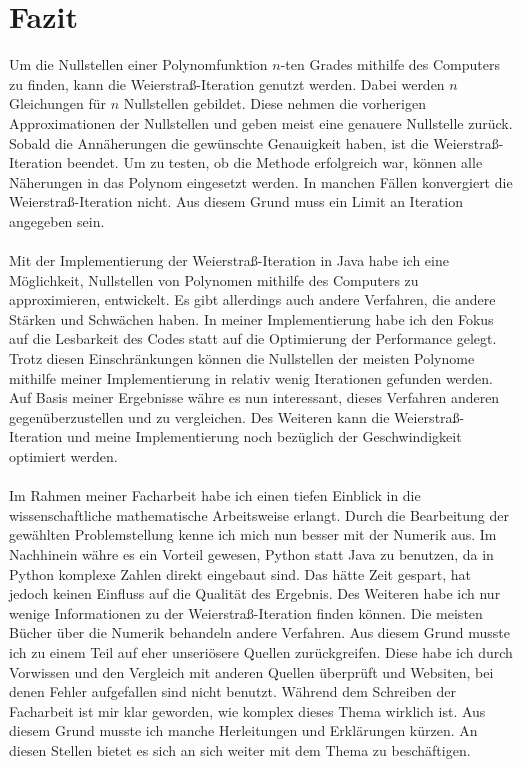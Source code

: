 \documentclass[12pt]{article}
\begin{document}
\section{Fazit}
Um die Nullstellen einer Polynomfunktion $n$-ten Grades mithilfe des Computers zu finden, kann die Weierstraß-Iteration genutzt werden. Dabei werden $n$ Gleichungen für $n$ Nullstellen gebildet. Diese nehmen die vorherigen Approximationen der Nullstellen und geben meist eine genauere Nullstelle zurück. Sobald die Annäherungen die gewünschte Genauigkeit haben, ist die Weierstraß-Iteration beendet. Um zu testen, ob die Methode erfolgreich war, können alle Näherungen in das Polynom eingesetzt werden. In manchen Fällen konvergiert die Weierstraß-Iteration nicht. Aus diesem Grund muss ein Limit an Iteration angegeben sein.\\
\\
Mit der Implementierung der Weierstraß-Iteration in Java habe ich eine Möglichkeit, Nullstellen von Polynomen mithilfe des Computers zu approximieren, entwickelt. Es gibt allerdings auch andere Verfahren, die andere Stärken und Schwächen haben. In meiner Implementierung habe ich den Fokus auf die Lesbarkeit des Codes statt auf die Optimierung der Performance gelegt. Trotz diesen Einschränkungen können die Nullstellen der meisten Polynome mithilfe meiner Implementierung in relativ wenig Iterationen gefunden werden.\\
Auf Basis meiner Ergebnisse währe es nun interessant, dieses Verfahren anderen gegenüberzustellen und zu vergleichen. Des Weiteren kann die Weierstraß-Iteration und meine Implementierung noch bezüglich der Geschwindigkeit optimiert werden.\\
\\
Im Rahmen meiner Facharbeit habe ich einen tiefen Einblick in die wissenschaftliche mathematische Arbeitsweise erlangt. Durch die Bearbeitung der gewählten Problemstellung kenne ich mich nun besser mit der Numerik aus.
Im Nachhinein währe es ein Vorteil gewesen, Python statt Java zu benutzen, da in Python komplexe Zahlen direkt eingebaut sind. Das hätte Zeit gespart, hat jedoch keinen Einfluss auf die Qualität des Ergebnis.
Des Weiteren habe ich nur wenige Informationen zu der Weierstraß-Iteration finden können. Die meisten Bücher über die Numerik behandeln andere Verfahren. Aus diesem Grund musste ich zu einem Teil auf eher unseriösere Quellen zurückgreifen. Diese habe ich durch Vorwissen und den Vergleich mit anderen Quellen überprüft und Websiten, bei denen Fehler aufgefallen sind nicht benutzt.
Während dem Schreiben der Facharbeit ist mir klar geworden, wie komplex dieses Thema wirklich ist. Aus diesem Grund musste ich manche Herleitungen und Erklärungen kürzen. An diesen Stellen bietet es sich an sich weiter mit dem Thema zu beschäftigen.
\end{document}

